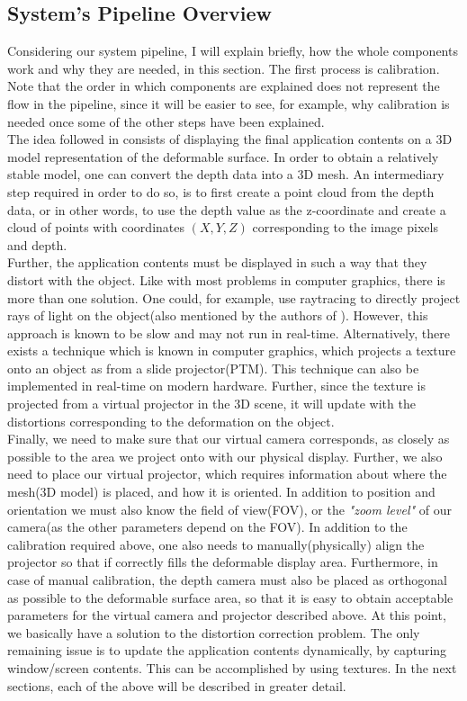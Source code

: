 \documentclass[]{article}
\begin{document}
\subsection{System's Pipeline Overview}

Considering our system pipeline, I will explain briefly, how the whole components work and why they are needed, in this section. The first process is calibration. Note that the order in which components are explained does not represent the flow in the pipeline, since it will be easier to see, for example, why calibration is needed once some of the other steps have been explained.\\

The idea followed in \cite{watanabe08} consists of displaying the final application contents on a 3D model representation of the deformable surface. In order to obtain a relatively stable model, one can convert the depth data into a 3D mesh. An intermediary step required in order to do so, is to first create a point cloud from the depth data, or in other words, to use the depth value as the z-coordinate and create a cloud of points with coordinates $(X, Y, Z)$ corresponding to the image pixels and depth.\\

Further, the application contents must be displayed in such a way that they distort with the object. Like with most problems in computer graphics, there is more than one solution. One could, for example, use raytracing to directly project rays of light on the object(also mentioned by the authors of \cite{raskar98}). However, this approach is known to be slow and may not run in real-time. Alternatively, there exists a technique which is known in computer graphics, which projects a texture onto an object as from a slide projector(PTM). This technique can also be implemented in real-time on modern hardware. Further, since the texture is projected from a virtual projector in the 3D scene, it will update with the distortions corresponding to the deformation on the object.\\

Finally, we need to make sure that our virtual camera corresponds, as closely as possible to the area we project onto with our physical display. Further, we also need to place our virtual projector, which requires information about where the mesh(3D model) is placed, and how it is oriented. In addition to position and orientation we must also know the field of view(FOV), or the \textit{"zoom level"} of our camera(as the other parameters depend on the FOV). In addition to the calibration required above, one also needs to manually(physically) align the projector so that if correctly fills the deformable display area. Furthermore, in case of manual calibration, the depth camera must also be placed as orthogonal as possible to the deformable surface area, so that it is easy to obtain acceptable parameters for the virtual camera and projector described above. At this point, we basically have a solution to the distortion correction problem. The only remaining issue is to update the application contents dynamically, by capturing window/screen contents. This can be accomplished by using textures. In the next sections, each of the above will be described in greater detail.
\end{document}
